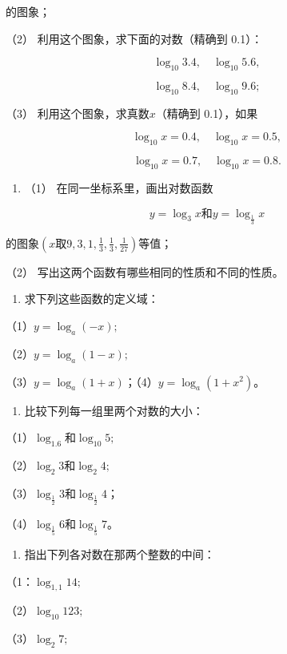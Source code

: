的图象；

（2） 利用这个图象，求下面的对数（精确到 0.1）：

\[
\log_{10} 3.4, \quad \log_{10} 5.6,
\]

\[
\log_{10} 8.4, \quad \log_{10} 9.6;
\]

（3） 利用这个图象，求真数\(x\)（精确到 0.1），如果

\[
\log_{10} x = 0.4, \quad \log_{10} x = 0.5,
\]

\[
\log_{10} x = 0.7, \quad \log_{10} x = 0.8.
\]

\begin{enumerate}[start=2]
\item
  （1） 在同一坐标系里，画出对数函数
\end{enumerate}

\[
y = \log_{3} x \text{和} y = \log_{\frac{1}{3}} x
\]

的图象\(\left(x\text{取}9,3,1,\frac{1}{3},\frac{1}{3},\frac{1}{27}\right)\)等值；

（2） 写出这两个函数有哪些相同的性质和不同的性质。

\begin{enumerate}[start=3]
\item
  求下列这些函数的定义域：
\end{enumerate}

（1）\(y = \log_a(-x);\)

（2）\(y = \log_a(1 - x);\)

（3）\(y = \log_a(1 + x)\)；（4）\(y = \log_a(1 + x^2)\)。

\begin{enumerate}[start=4]
\item
  比较下列每一组里两个对数的大小：
\end{enumerate}

（1）\(\log_{1.6}\)和\(\log_{10}5;\)

（2）\(\log_{2}3\)和\(\log_{2}4;\)

（3）\(\log_{\frac{1}{2}} 3\)和\(\log_{\frac{1}{2}} 4\)；

（4）\(\log_{\frac{1}{5}} 6\)和\(\log_{\frac{1}{5}} 7\)。

\begin{enumerate}[start=5]
\item
  指出下列各对数在那两个整数的中间：
\end{enumerate}

（1：\(\log_{1,1}14;\)

（2）\(\log_{10}123;\)

（3）\(\log_{2}7;\)

